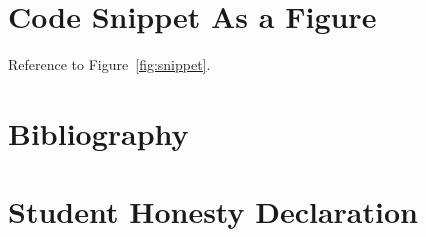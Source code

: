 \section{Code Snippet As a Figure}

Reference to Figure~\vref{fig:snippet}. %


\newpage

\section{Bibliography}

\renewcommand{\refname}{\spacedlowsmallcaps{References}} %



%


%


\section{Student Honesty Declaration}





